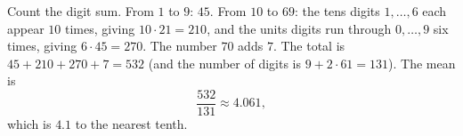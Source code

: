 Count the digit sum. From $1$ to $9$: $45$. From $10$ to $69$: the tens digits $1,\dots,6$ each appear $10$ times, giving $10\cdot21=210$, and the units digits run through $0,\dots,9$ six times, giving $6\cdot45=270$. The number $70$ adds $7$. The total is $45+210+270+7=532$ (and the number of digits is $9+2\cdot61=131$). The mean is
\[
\dfrac{532}{131}\approx4.061,
\]
which is $\boxed{4.1}$ to the nearest tenth.
